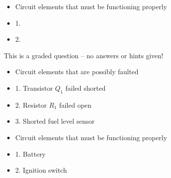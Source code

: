 \begin{itemize}
\goodbreak
\item{} Circuit elements that must be functioning properly
\item{1.} 
\item{2.} 
\end{itemize}

\vfil 

\eject






This is a graded question -- no answers or hints given!







\begin{itemize}
\item{} Circuit elements that are possibly faulted
\item{1.} Transistor $Q_1$ failed shorted
\item{2.} Resistor $R_1$ failed open
\item{3.} Shorted fuel level sensor
\end{itemize}

\begin{itemize}
\item{} Circuit elements that must be functioning properly
\item{1.} Battery
\item{2.} Ignition switch
\end{itemize}





